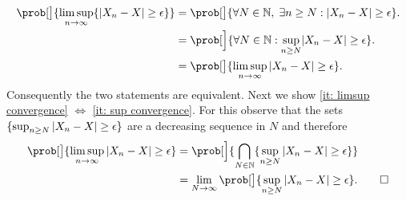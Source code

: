 \begin{exercise}
\begin{solution}
        \[\begin{aligned}
            \prob[\big]{\limsup_{n \to \infty} \set{\abs{X_n - X} \ge \epsilon}}
            &= \prob[\big]{\forall N \in \nat,\; \exists n\ge N: \abs{X_n - X} \ge \epsilon}.
            \\
            &= \prob[\Big]{\forall N \in \nat: \sup_{n\ge N} \abs{X_n - X} \ge \epsilon}.
            \\
            &= \prob[\big]{\limsup_{n \to \infty} |X_n - X| \ge \epsilon}.
        \end{aligned}
        \]
        Consequently the two statements are equivalent. Next we show
        \ref{it: limsup convergence} \(\Leftrightarrow\) \ref{it: sup
        convergence}.  For this observe that the sets \(\{\sup_{n \ge N} |X_n
        - X| \ge \epsilon\}\) are a decreasing sequence in \(N\) and therefore
        \begin{align*}
            \prob[\big]{\limsup_{n \to \infty} |X_n - X| \ge \epsilon}
            &= \prob[\Big]{\bigcap_{N\in \nat} \set{\sup_{n \ge N} |X_n - X| \ge \epsilon}}
            \\
            &= \lim_{N\to \infty} \prob[\big]{\sup_{n \ge N} |X_n - X| \ge \epsilon}.
            \qedhere
        \end{align*}
    \end{solution}
\end{exercise}

